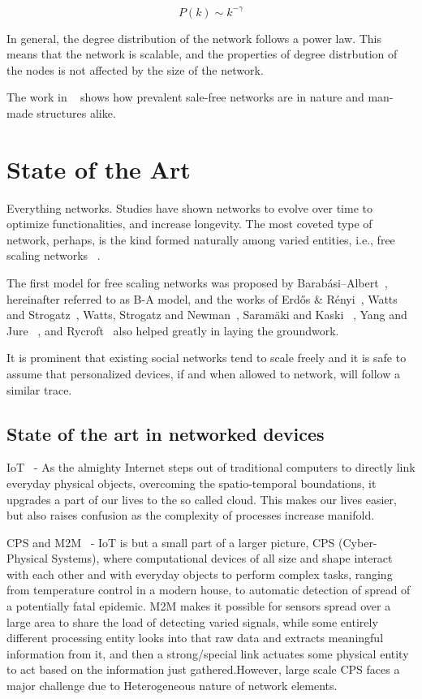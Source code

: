 \begin{equation}
P(k) \sim k^{-\gamma}
\label{eqn:power law}
\end{equation}

In general, the degree distribution of the network follows a power law. This means that the network is scalable, and the properties of degree distrbution of the nodes is not affected by the size of the network. 

The work in ~\cite{1999Sci...286..509B} shows how prevalent sale-free networks are in nature and man-made structures alike.



\section{State of the Art}
Everything networks. Studies have shown networks to evolve over time to optimize functionalities, and increase longevity. The most coveted type of network, perhaps, is the kind formed naturally among varied entities, i.e., free scaling networks ~\cite{1999Sci...286..509B, 2002RvMP...74...47A}.

The first model for free scaling networks was proposed by Barab{\'a}si–Albert~\cite{1999Sci...286..509B}, hereinafter referred to as B-A model, and the works of Erd\H{o}s \& R\'{e}nyi~\cite{Erdos60onthe}, Watts and Strogatz~\cite{1251797}, Watts, Strogatz and Newman~\cite{PhysRevE.64.026118},  Saramäki  and Kaski~\cite{Saramaki200480} , Yang and Jure~\cite{Yang_modelinginformation} , and  Rycroft~\cite{Rycroft2007565} also helped greatly in laying the groundwork.

It is prominent that existing social networks tend to scale freely and it is safe to assume that personalized devices, if and when allowed to network, will follow a similar trace.

\subsection{State of the art in networked devices}

IoT~\cite{Internet-of-things} - As the almighty Internet steps out of traditional computers to directly link everyday physical objects, overcoming the spatio-temporal boundations, it upgrades a part of our lives to the so called cloud.
This makes our lives easier, but also raises confusion as the complexity of processes increase manifold. 

CPS and M2M~\cite{6601317} - IoT is but a small part of a larger picture, CPS (Cyber-Physical Systems), where computational devices of all size and shape interact with each other and with everyday objects to perform complex tasks, ranging from temperature control in a modern house, to automatic detection of spread of a potentially fatal epidemic.
M2M makes it possible for sensors spread over a large area to share the load of detecting varied signals, while some entirely different processing entity looks into that raw data and extracts meaningful information from it, and then a strong/special link actuates some physical entity to act based on the  information just gathered.However, large scale CPS faces a major challenge due to Heterogeneous nature of network elements.

